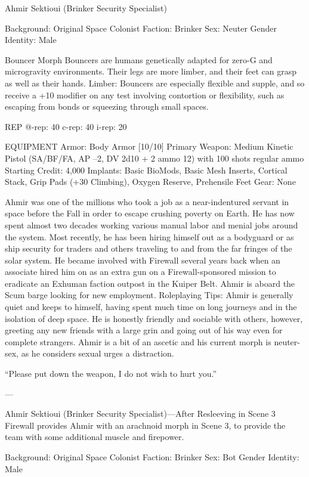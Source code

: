 Ahmir Sektioui (Brinker Security Specialist)

Background: Original Space Colonist
Faction: Brinker
Sex: Neuter
Gender Identity: Male

Bouncer Morph
Bouncers are humans genetically adapted for zero-G and microgravity environments. Their legs are more limber, and their feet can grasp as well as their hands.
Limber: Bouncers are especially flexible and supple, and so receive a +10 modifier on any test involving contortion or flexibility, such as escaping from bonds or squeezing through small spaces.

REP
@-rep:	40
c-rep:	40
i-rep:	20

EQUIPMENT
Armor: Body Armor [10/10]
Primary Weapon: Medium Kinetic Pistol (SA/BF/FA, AP –2, DV 2d10 + 2 ammo 12) with 100 shots regular ammo
Starting Credit: 4,000
Implants: Basic BioMods, Basic Mesh Inserts, Cortical Stack, Grip Pads (+30 Climbing), Oxygen Reserve, Prehensile Feet
Gear: None

Ahmir was one of the millions who took a job as a near-indentured servant in space before the Fall in order to escape crushing poverty on Earth. He has now spent almost two decades working various manual labor and menial jobs around the system. Most recently, he has been hiring himself out as a bodyguard or as ship security for traders and others traveling to and from the far fringes of the solar system. He became involved with Firewall several years back when an associate hired him on as an extra gun on a Firewall-sponsored mission to eradicate an Exhuman faction outpost in the Kuiper Belt. Ahmir is aboard the Scum barge looking for new employment.
Roleplaying Tips: Ahmir is generally quiet and keeps to himself, having spent much time on long journeys and in the isolation of deep space. He is honestly friendly and sociable with others, however, greeting any new friends with a large grin and going out of his way even for complete strangers. Ahmir is a bit of an ascetic and his current morph is neuter-sex, as he considers sexual urges a distraction.

“Please put down the weapon, I do not wish to hurt you.”

---

Ahmir Sektioui (Brinker Security Specialist)—After Resleeving in Scene 3
Firewall provides Ahmir with an arachnoid morph in Scene 3, to provide the team with some additional muscle and firepower.

Background: Original Space Colonist
Faction: Brinker
Sex: Bot
Gender Identity: Male

